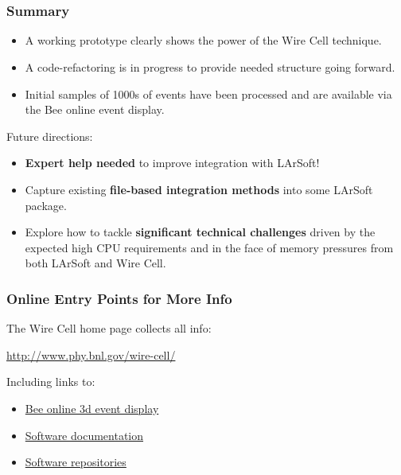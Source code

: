 \documentclass[xcolor=dvipsnames]{beamer}
\begin{document}
\section{}

\begin{frame}
  \frametitle{Summary}
  \begin{itemize}
  \item A working prototype clearly shows the power of the Wire Cell technique.
  \item A code-refactoring is in progress to provide needed structure going forward.
  \item Initial samples of 1000s of events have been processed and are
    available via the Bee online event display.
  \end{itemize}
  Future directions:
  \begin{itemize}
  \item \textbf{Expert help needed} to improve integration with
    LArSoft!
  \item Capture existing \textbf{file-based integration methods} into some
    LArSoft package.
  \item Explore how to tackle \textbf{significant technical
      challenges} driven by the expected high CPU requirements and in
    the face of memory pressures from both LArSoft and Wire Cell.
  \end{itemize}
\end{frame}

\begin{frame}
  \frametitle{Online Entry Points for More Info}
  The Wire Cell home page collects all info:
  \begin{center}
    \url{http://www.phy.bnl.gov/wire-cell/}    
  \end{center}
  Including links to:
  \begin{itemize}
  \item \href{http://www.phy.bnl.gov/wire-cell/examples/list/}{Bee online
      3d event display}
  \item \href{http://bnlif.github.io/wire-cell-docs/}{Software documentation}
  \item \href{https://github.com/BNLIF/wire-cell/}{Software repositories}
  \end{itemize}
\end{frame}
\end{document}
